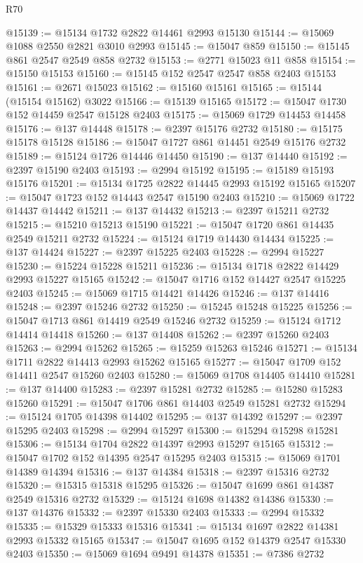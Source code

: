 \begin{lexlean}{R70}
\begin{coremodule}
@15139 := @15134 @1732 @2822 @14461 @2993 @15130
@15144 := @15069 @1088 @2550 @2821 @3010 @2993
@15145 := @15047 @859
@15150 := @15145 @861 @2547 @2549 @858 @2732
@15153 := @2771 @15023 @11 @858
@15154 := @15150 @15153
@15160 := @15145 @152 @2547 @2547 @858 @2403 @15153
@15161 := @2671 @15023
@15162 := @15160 @15161
@15165 := @15144 (@15154 @15162) @3022
@15166 := @15139 @15165
@15172 := @15047 @1730 @152 @14459 @2547 @15128 @2403
@15175 := @15069 @1729 @14453 @14458
@15176 := @137 @14448
@15178 := @2397 @15176 @2732
@15180 := @15175 @15178 @15128
@15186 := @15047 @1727 @861 @14451 @2549 @15176 @2732
@15189 := @15124 @1726 @14446 @14450
@15190 := @137 @14440
@15192 := @2397 @15190 @2403
@15193 := @2994 @15192
@15195 := @15189 @15193 @15176
@15201 := @15134 @1725 @2822 @14445 @2993 @15192 @15165
@15207 := @15047 @1723 @152 @14443 @2547 @15190 @2403
@15210 := @15069 @1722 @14437 @14442
@15211 := @137 @14432
@15213 := @2397 @15211 @2732
@15215 := @15210 @15213 @15190
@15221 := @15047 @1720 @861 @14435 @2549 @15211 @2732
@15224 := @15124 @1719 @14430 @14434
@15225 := @137 @14424
@15227 := @2397 @15225 @2403
@15228 := @2994 @15227
@15230 := @15224 @15228 @15211
@15236 := @15134 @1718 @2822 @14429 @2993 @15227 @15165
@15242 := @15047 @1716 @152 @14427 @2547 @15225 @2403
@15245 := @15069 @1715 @14421 @14426
@15246 := @137 @14416
@15248 := @2397 @15246 @2732
@15250 := @15245 @15248 @15225
@15256 := @15047 @1713 @861 @14419 @2549 @15246 @2732
@15259 := @15124 @1712 @14414 @14418
@15260 := @137 @14408
@15262 := @2397 @15260 @2403
@15263 := @2994 @15262
@15265 := @15259 @15263 @15246
@15271 := @15134 @1711 @2822 @14413 @2993 @15262 @15165
@15277 := @15047 @1709 @152 @14411 @2547 @15260 @2403
@15280 := @15069 @1708 @14405 @14410
@15281 := @137 @14400
@15283 := @2397 @15281 @2732
@15285 := @15280 @15283 @15260
@15291 := @15047 @1706 @861 @14403 @2549 @15281 @2732
@15294 := @15124 @1705 @14398 @14402
@15295 := @137 @14392
@15297 := @2397 @15295 @2403
@15298 := @2994 @15297
@15300 := @15294 @15298 @15281
@15306 := @15134 @1704 @2822 @14397 @2993 @15297 @15165
@15312 := @15047 @1702 @152 @14395 @2547 @15295 @2403
@15315 := @15069 @1701 @14389 @14394
@15316 := @137 @14384
@15318 := @2397 @15316 @2732
@15320 := @15315 @15318 @15295
@15326 := @15047 @1699 @861 @14387 @2549 @15316 @2732
@15329 := @15124 @1698 @14382 @14386
@15330 := @137 @14376
@15332 := @2397 @15330 @2403
@15333 := @2994 @15332
@15335 := @15329 @15333 @15316
@15341 := @15134 @1697 @2822 @14381 @2993 @15332 @15165
@15347 := @15047 @1695 @152 @14379 @2547 @15330 @2403
@15350 := @15069 @1694 @9491 @14378
@15351 := @7386 @2732

\end{coremodule}
\end{lexlean}
